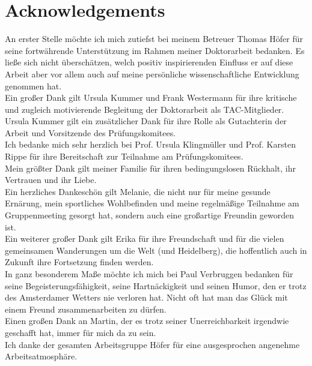 \chapter*{Acknowledgements}
\thispagestyle{plain2}


An erster Stelle m\"ochte ich mich zutiefst bei meinem Betreuer Thomas H\"ofer f\"ur seine fortw\"ahrende Unterst\"utzung im Rahmen meiner Doktorarbeit  bedanken. Es lie\ss{}e sich nicht \"ubersch\"atzen, welch positiv inspirierenden Einfluss er auf diese Arbeit aber vor allem auch auf meine pers\"onliche wissenschaftliche Entwicklung genommen hat. \\

Ein gro\ss{}er Dank gilt Ursula Kummer und Frank Westermann f\"ur ihre kritische und zugleich motivierende Begleitung der Doktorarbeit als TAC-Mitglieder. Ursula Kummer gilt ein zus\"atzlicher Dank f\"ur ihre Rolle als Gutachterin der Arbeit und Vorsitzende des Pr\"ufungskomitees.\\

Ich bedanke mich sehr herzlich bei Prof. Ursula Klingm\"uller und Prof. Karsten Rippe f\"ur ihre Bereitschaft zur Teilnahme am Pr\"ufungskomitees.\\

Mein gr\"o\ss{}ter Dank gilt meiner Familie f\"{u}r ihren bedingungslosen R\"{u}ckhalt, ihr Vertrauen und ihr Liebe.\\

Ein herzliches Dankesch\"{o}n gilt Melanie, die nicht nur f\"{u}r meine gesunde Ern\"{a}rung, mein sportliches Wohlbefinden und meine regelm\"{a}\ss{}ige Teilnahme am Gruppenmeeting gesorgt hat, sondern auch eine gro\ss{}artige Freundin geworden ist. \\      

Ein weiterer gro\ss{}er Dank gilt Erika für ihre Freundschaft und für die vielen gemeinsamen Wanderungen um die Welt (und Heidelberg), die hoffentlich auch in Zukunft ihre Fortsetzung finden werden.\\

In ganz besonderem Ma\ss{}e m\"{o}chte ich mich bei Paul Verbruggen bedanken f\"ur seine Begeisterungsf\"{a}higkeit, seine Hartn\"{a}ckigkeit und seinen Humor, den er trotz des Amsterdamer Wetters nie verloren hat. Nicht oft hat man das Gl\"{u}ck mit einem Freund zusammenarbeiten zu d\"{u}rfen.\\

Einen gro\ss{}en Dank an Martin, der es trotz seiner Unerreichbarkeit irgendwie geschafft hat, immer f\"{u}r mich da zu sein.\\

Ich danke der gesamten Arbeitsgruppe H\"{o}fer f\"{u}r eine ausgesprochen angenehme Arbeitsatmosph\"{a}re.  